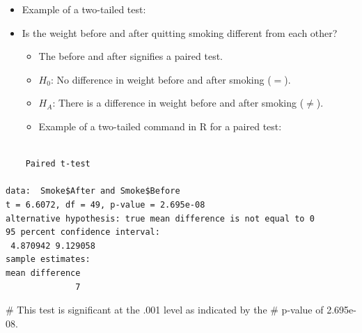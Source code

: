 \documentclass[
  letterpaper,
  DIV=11,
  numbers=noendperiod]{scrreprt}
\newenvironment{Shaded}{\begin{snugshade}}{\end{snugshade}}
\newcommand{\AttributeTok}[1]{\textcolor[rgb]{0.40,0.45,0.13}{#1}}
\newcommand{\CommentTok}[1]{\textcolor[rgb]{0.37,0.37,0.37}{#1}}
\newcommand{\ConstantTok}[1]{\textcolor[rgb]{0.56,0.35,0.01}{#1}}
\newcommand{\FunctionTok}[1]{\textcolor[rgb]{0.28,0.35,0.67}{#1}}
\newcommand{\NormalTok}[1]{\textcolor[rgb]{0.00,0.23,0.31}{#1}}
\newcommand{\OtherTok}[1]{\textcolor[rgb]{0.00,0.23,0.31}{#1}}
\newcommand{\SpecialCharTok}[1]{\textcolor[rgb]{0.37,0.37,0.37}{#1}}
\newcommand{\StringTok}[1]{\textcolor[rgb]{0.13,0.47,0.30}{#1}}
\providecommand{\tightlist}{%
  \setlength{\itemsep}{0pt}\setlength{\parskip}{0pt}}\usepackage{longtable,booktabs,array}
\begin{document}
\begin{itemize}
\tightlist
\item
  Example of a two-tailed test:
\item
  Is the weight before and after quitting smoking different from each
  other?

  \begin{itemize}
  \tightlist
  \item
    The before and after signifies a paired test.
  \item
    \(H_0\): No difference in weight before and after smoking (\(=\)).
  \item
    \(H_A\): There is a difference in weight before and after smoking
    (\(\neq\)).
  \item
    Example of a two-tailed command in R for a paired test:
  \end{itemize}
\end{itemize}

\begin{Shaded}
\end{Shaded}

\begin{verbatim}

    Paired t-test

data:  Smoke$After and Smoke$Before
t = 6.6072, df = 49, p-value = 2.695e-08
alternative hypothesis: true mean difference is not equal to 0
95 percent confidence interval:
 4.870942 9.129058
sample estimates:
mean difference 
              7 
\end{verbatim}

\begin{Shaded}
\begin{Highlighting}[]
\CommentTok{\# This test is significant at the .001 level as indicated by the}
\CommentTok{\# p{-}value of 2.695e{-}08.}
\end{Highlighting}
\end{Shaded}
\end{document}
